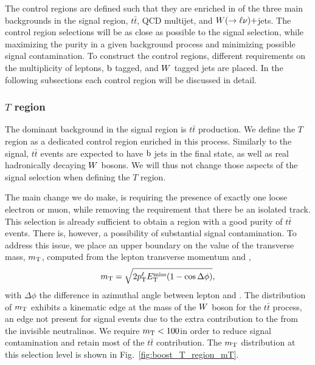 
The control regions are defined such that they are enriched in of the three main backgrounds in the
signal region, $t\bar{t}$, QCD multijet, and $W(\rightarrow \ell \nu)+$jets. The control region
selections will be as close as possible to the signal selection, while maximizing the purity in a
given background process and minimizing possible signal contamination. 
To construct the control regions, different requirements on the 
multiplicity of leptons, $\mathrm{b}$ tagged, and $W$ tagged jets are placed. 
In the following subsections each control region will be discussed in detail. 

\subsubsection{\texorpdfstring{$T$}{T} region \label{sec:boost_T_region}}

The dominant background in the signal region is $t\bar{t}$ production. We define the $T$ region as a
dedicated control region enriched in this process. 
Similarly to the signal, $t\bar{t}$ events are expected to have $\mathrm{b}$ jets in the final state, as
well as real hadronically decaying $W$ bosons. We will thus not change those aspects of the signal
selection when defining the $T$ region. 

The main change we do make, is requiring the presence of exactly one loose electron or muon, while
removing the requirement that there be an isolated track. This selection is already sufficient to
obtain a region with a good purity of $t\bar{t}$ events. There is, however, a possibility of
substantial signal contamination. To address this issue, we place an upper boundary on the value of
the transverse mass, $m_{\mathrm{T}}$, computed from the lepton transverse momentum and \VEtmiss, 
\begin{equation}
 m_{\mathrm{T}} = \sqrt{2p_{\mathrm{T}}^\ell E_{\mathrm{T}}^{\text{miss}} ( 1 - \cos\Delta\phi )},
\end{equation}
with $\Delta\phi$ the difference in azimuthal angle between lepton and \VEtmiss. 
The distribution of $m_{\mathrm{T}}$ exhibits a kinematic edge at the mass of the $W$ boson for the $t\bar{t}$
process, an edge not present for signal events due to the extra contribution to the \ETm from the
invisible neutralinos.  We require $m_{\mathrm{T}} < 100$\GeV in order to reduce signal contamination and
retain most of the $t\bar{t}$ contribution. The $m_{\mathrm{T}}$ distribution at this selection level is shown
in Fig.~\ref{fig:boost_T_region_mT}. 

